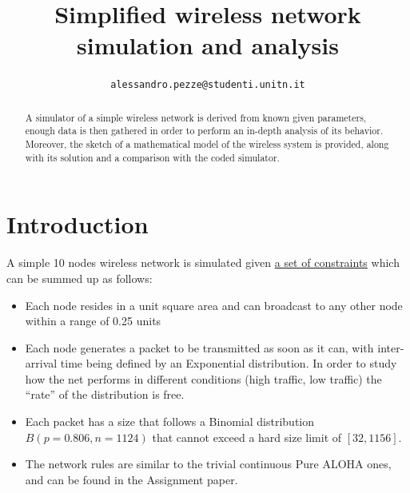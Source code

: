 \documentclass[conference]{IEEEtran}
\begin{document}
\title{Simplified wireless network simulation and analysis}

\author{
    \texttt{alessandro.pezze@studenti.unitn.it}
}

\maketitle

\begin{abstract}
A simulator of a simple wireless network is derived from known given parameters, enough data is then gathered in order to perform an in-depth analysis of its behavior. Moreover, the sketch of a mathematical model of the wireless system is provided, along with its solution and a comparison with the coded simulator.
\end{abstract}

\section{Introduction}\label{sec:introduction}
A simple 10 nodes wireless network is simulated given \href{http://www.sharelatex.com}{a set of constraints} which can be summed up as follows:
\begin{itemize}
\item Each node resides in a unit square area and can broadcast to any other node within a range of 0.25 units
\item Each node generates a packet to be transmitted as soon as it can, with inter-arrival time being defined by an Exponential distribution. In order to study how the net performs in different conditions (high traffic, low traffic) the “rate” of the distribution is free.
\item Each packet has a size that follows a Binomial distribution \(B(p=0.806, n=1124)\) that cannot exceed a hard size limit of \([32, 1156]\).
\item The network rules are similar to the trivial continuous Pure ALOHA ones, and can be found in the Assignment paper.
\end{itemize}
\end{document}
